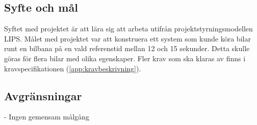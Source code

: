 \subsection{Syfte och mål}

Syftet med projektet är att lära sig att arbeta utifrån
projektstyrningsmodellen LIPS. Målet med projektet var att konstruera ett system
som kunde köra bilar runt en bilbana på en vald referenstid mellan 12 och 15
sekunder. Detta skulle göras för flera bilar med olika egenskaper. Fler krav som
ska klaras av finns i kravspecifikationen (\ref{app:kravbeskrivning}).

\subsection{Avgränsningar}

- Ingen gemensam målgång
